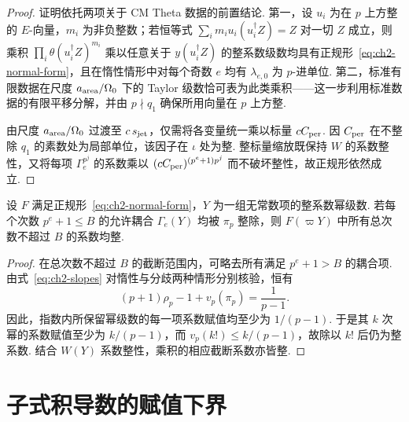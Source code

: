 \begin{proof}
证明依托两项关于 CM Theta 数据的前置结论. 第一，设 $u_i$ 为在 $p$ 上方整的 $E$-向量，$m_i$ 为非负整数；若恒等式 $\sum_i m_i u_i(u_i^\dagger Z)=Z$ 对一切 $Z$ 成立，则乘积 $\prod_i\theta(u_i^\dagger Z)^{m_i}$ 乘以任意关于 $y(u_i^\dagger Z)$ 的整系数级数均具有正规形~\eqref{eq:ch2-normal-form}，且在惰性情形中对每个奇数 $e$ 均有 $\lambda_{e,0}$ 为 $p$-进单位. 第二，标准有限数据在尺度 $a_{\rm area}/\Omega_0$ 下的 Taylor 级数恰可表为此类乘积——这一步利用标准数据的有限平移分解，并由 $p\nmid q_1$ 确保所用向量在 $p$ 上方整.

由尺度 $a_{\rm area}/\Omega_0$ 过渡至 $c\,s_{\rm jet}$，仅需将各变量统一乘以标量 $cC_{\rm per}$. 因 $C_{\rm per}$ 在不整除 $q_1$ 的素数处为局部单位，该因子在 $\iota$ 处为整. 整标量缩放既保持 $W$ 的系数整性，又将每项 $\Gamma_e^{p^j}$ 的系数乘以 $(cC_{\rm per})^{(p^e+1)p^j}$ 而不破坏整性，故正规形依然成立.
\end{proof}

\begin{lemma}[替换后的有限阶整性]
\label{lem:ch2-truncated-integrality}
设 $F$ 满足正规形~\eqref{eq:ch2-normal-form}，$Y$ 为一组无常数项的整系数幂级数. 若每个次数 $p^e+1\le B$ 的允许耦合 $\Gamma_e(Y)$ 均被 $\pi_p$ 整除，则 $F(\varpi Y)$ 中所有总次数不超过 $B$ 的系数均整.
\end{lemma}

\begin{proof}
在总次数不超过 $B$ 的截断范围内，可略去所有满足 $p^e+1>B$ 的耦合项. 由式~\eqref{eq:ch2-slopes} 对惰性与分歧两种情形分别核验，恒有
\begin{equation}
\label{eq:ch2-exp-valuation}
 (p+1)\rho_p-1+v_p(\pi_p)=\frac1{p-1}.
\end{equation}
因此，指数内所保留幂级数的每一项系数赋值均至少为 $1/(p-1)$. 于是其 $k$ 次幂的系数赋值至少为 $k/(p-1)$，而 $v_p(k!)\le k/(p-1)$，故除以 $k!$ 后仍为整系数. 结合 $W(Y)$ 系数整性，乘积的相应截断系数亦皆整.
\end{proof}

\section{子式积导数的赋值下界}
\label{sec:ch2-jet-divisibility}

